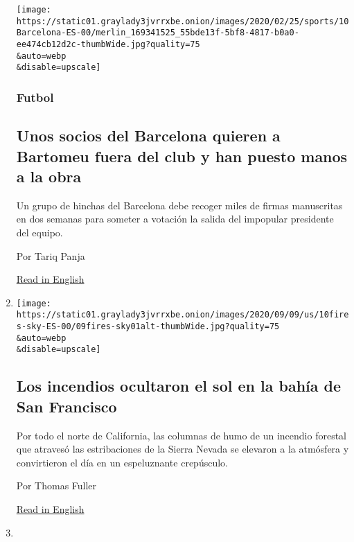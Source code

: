 \begin{enumerate}
  \texttt{[image: https://static01.graylady3jvrrxbe.onion/images/2020/02/25/sports/10Barcelona-ES-00/merlin\_169341525\_55bde13f-5bf8-4817-b0a0-ee474cb12d2c-thumbWide.jpg?quality=75\\\&auto=webp\\\&disable=upscale]}

  \hypertarget{futbol}{%
  \subsubsection{Futbol}\label{futbol}}

  \hypertarget{unos-socios-del-barcelona-quieren-a-bartomeu-fuera-del-club-y-han-puesto-manos-a-la-obra}{%
  \subsection{Unos socios del Barcelona quieren a Bartomeu fuera del
  club y han puesto manos a la
  obra}\label{unos-socios-del-barcelona-quieren-a-bartomeu-fuera-del-club-y-han-puesto-manos-a-la-obra}}

  Un grupo de hinchas del Barcelona debe recoger miles de firmas
  manuscritas en dos semanas para someter a votación la salida del
  impopular presidente del equipo.

  Por Tariq Panja

  \href{https://www.nytimes3xbfgragh.onion/2020/09/08/sports/soccer/barcelona-bartomeu.html}{Read
  in English}
\item
  \href{/es/2020/09/10/espanol/estados-unidos/incendios-california.html}{}

  \texttt{[image: https://static01.graylady3jvrrxbe.onion/images/2020/09/09/us/10fires-sky-ES-00/09fires-sky01alt-thumbWide.jpg?quality=75\\\&auto=webp\\\&disable=upscale]}

  \hypertarget{los-incendios-ocultaron-el-sol-en-la-bahuxeda-de-san-francisco}{%
  \subsection{Los incendios ocultaron el sol en la bahía de San
  Francisco}\label{los-incendios-ocultaron-el-sol-en-la-bahuxeda-de-san-francisco}}

  Por todo el norte de California, las columnas de humo de un incendio
  forestal que atravesó las estribaciones de la Sierra Nevada se
  elevaron a la atmósfera y convirtieron el día en un espeluznante
  crepúsculo.

  Por Thomas Fuller

  \href{https://www.nytimes3xbfgragh.onion/2020/09/09/us/pictures-photos-california-fires.html}{Read
  in English}
\item
  \href{/es/2020/09/10/espanol/cultura/cecilia-romo-coronavirus.html}{}


\end{enumerate}
